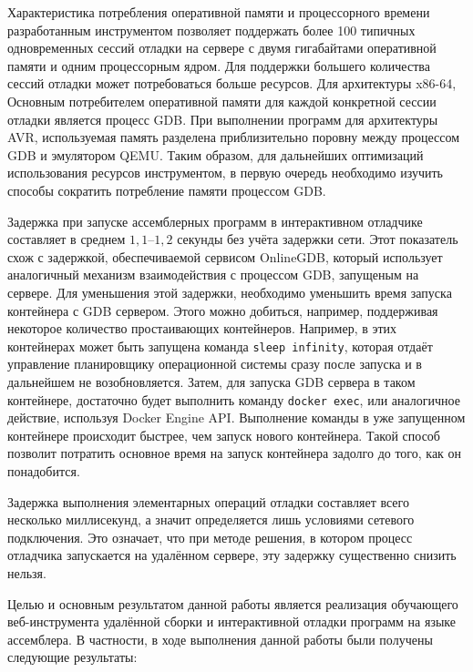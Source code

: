 \documentclass[a4paper,article,14pt]{extarticle}
\begin{document}
Характеристика потребления оперативной памяти и процессорного времени разработанным инструментом позволяет поддержать более 100 типичных одновременных сессий отладки на сервере с двумя гигабайтами оперативной памяти и одним процессорным ядром. Для поддержки большего количества сессий отладки может потребоваться больше ресурсов. Для архитектуры x86-64, Основным потребителем оперативной памяти для каждой конкретной сессии отладки является процесс GDB. При выполнении программ для архитектуры AVR, используемая память разделена приблизительно поровну между процессом GDB и эмулятором  QEMU. Таким образом, для дальнейших оптимизаций использования ресурсов инструментом, в первую очередь необходимо изучить способы сократить потребление памяти процессом GDB.

Задержка при запуске ассемблерных программ в интерактивном отладчике составляет в среднем $1{,}1$--$1{,}2$ секунды без учёта задержки сети. Этот показатель схож с задержкой, обеспечиваемой сервисом OnlineGDB\cite{onlinegdb}, который использует аналогичный механизм взаимодействия с процессом GDB, запущеным на сервере. Для уменьшения этой задержки, необходимо уменьшить время запуска контейнера с GDB сервером. Этого можно добиться, например, поддерживая некоторое количество простаивающих контейнеров. Например, в этих контейнерах может быть запущена команда \texttt{sleep infinity}, которая отдаёт управление планировщику операционной системы сразу после запуска и в дальнейшем не возобновляется. Затем, для запуска GDB сервера в таком контейнере, достаточно будет выполнить команду \texttt{docker exec}, или аналогичное действие, используя Docker Engine API. Выполнение команды в уже запущенном контейнере происходит быстрее, чем запуск нового контейнера. Такой способ позволит потратить основное время на запуск контейнера задолго до того, как он понадобится.

Задержка выполнения элементарных операций отладки составляет всего несколько миллисекунд, а значит определяется лишь условиями сетевого подключения. Это означает, что при методе решения, в котором процесс отладчика запускается на удалённом сервере, эту задержку существенно снизить нельзя.

\pagebreak
{}

Целью и основным результатом данной работы является реализация обучающего веб-инструмента удалённой сборки и интерактивной отладки программ на языке ассемблера. В частности, в ходе выполнения данной работы были получены следующие результаты:
\end{document}
